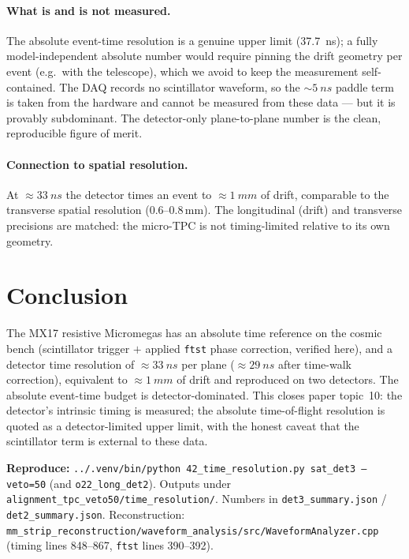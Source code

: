 \documentclass[11pt]{article}
\newcommand{\dmm}{\,\mathrm{mm}}
\begin{document}
\paragraph{What is and is not measured.} The absolute event-time resolution is a
genuine upper limit (\SI{37.7}{ns}); a fully model-independent absolute number would
require pinning the drift geometry per event (e.g.\ with the telescope), which we
avoid to keep the measurement self-contained. The DAQ records no scintillator
waveform, so the ${\sim}\SI{5}{ns}$ paddle term is taken from the hardware and
cannot be measured from these data --- but it is provably subdominant. The
detector-only plane-to-plane number is the clean, reproducible figure of merit.

\paragraph{Connection to spatial resolution.} At $\approx\SI{33}{ns}$ the detector
times an event to $\approx\SI{1}{mm}$ of drift, comparable to the transverse
spatial resolution ($0.6$--$0.8\dmm$). The longitudinal (drift) and transverse
precisions are matched: the micro-TPC is not timing-limited relative to its own
geometry.

\section{Conclusion}
The MX17 resistive Micromegas has an absolute time reference on the cosmic bench
(scintillator trigger $+$ applied \texttt{ftst} phase correction, verified here),
and a detector time resolution of $\approx\SI{33}{ns}$ per plane
($\approx\SI{29}{ns}$ after time-walk correction), equivalent to $\approx\SI{1}{mm}$
of drift and reproduced on two detectors. The absolute event-time budget is
detector-dominated. This closes paper topic~10: the detector's intrinsic timing is
measured; the absolute time-of-flight resolution is quoted as a detector-limited
upper limit, with the honest caveat that the scintillator term is external to these
data.

\vspace{1em}
\footnotesize\noindent\textbf{Reproduce:}
\texttt{../.venv/bin/python 42\_time\_resolution.py sat\_det3 --veto=50} (and
\texttt{o22\_long\_det2}). Outputs under
\texttt{alignment\_tpc\_veto50/time\_resolution/}. Numbers in
\texttt{det3\_summary.json} / \texttt{det2\_summary.json}. Reconstruction:
\texttt{mm\_strip\_reconstruction/waveform\_analysis/src/WaveformAnalyzer.cpp}
(timing lines 848--867, \texttt{ftst} lines 390--392).
\end{document}
